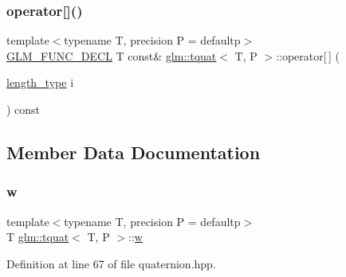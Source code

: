 \mbox{\label{structglm_1_1tquat_a868440e3dade7ee013bf9114285b8790}} 
\subsubsection{\texorpdfstring{operator[]()}{operator[]()}\hspace{0.1cm}{\footnotesize\ttfamily [2/2]}}
{\footnotesize\ttfamily template$<$typename T, precision P = defaultp$>$ \\
\mbox{\hyperlink{setup_8hpp_ab2d052de21a70539923e9bcbf6e83a51}{G\+L\+M\+\_\+\+F\+U\+N\+C\+\_\+\+D\+E\+CL}} T const\& \mbox{\hyperlink{structglm_1_1tquat}{glm\+::tquat}}$<$ T, P $>$\+::operator\mbox{[}$\,$\mbox{]} (\begin{DoxyParamCaption}\item[{\mbox{\hyperlink{structglm_1_1tquat_ab3ef67a20d129dcb01f042042218ba17}{length\+\_\+type}}}]{i }\end{DoxyParamCaption}) const}



\subsection{Member Data Documentation}
\mbox{\label{structglm_1_1tquat_a91055a4c17113bd3f357ffd8595d8ac0}} 
\subsubsection{\texorpdfstring{w}{w}}
{\footnotesize\ttfamily template$<$typename T, precision P = defaultp$>$ \\
T \mbox{\hyperlink{structglm_1_1tquat}{glm\+::tquat}}$<$ T, P $>$\+::\mbox{\hyperlink{glad_8h_a1d0296e9e835f2e1ee17634af95fc1ec}{w}}}



Definition at line 67 of file quaternion.\+hpp.

\mbox{\label{structglm_1_1tquat_a4e7a21e85428fa8d10e613f109185f28}} 
